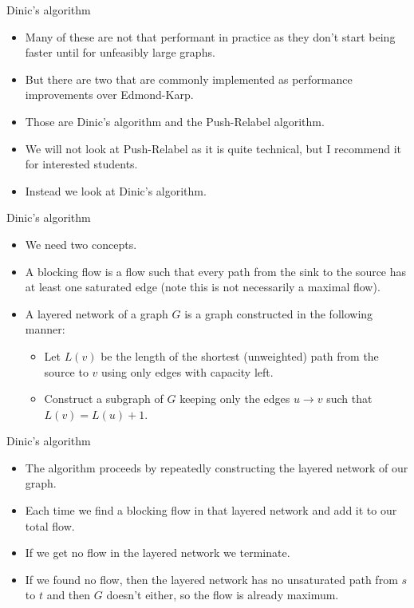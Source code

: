 \documentclass{beamer}
\begin{document}
	\begin{frame}[plain]{Dinic's algorithm}
		\begin{itemize}
			\item Many of these are not that performant in practice as they don't start being faster until for unfeasibly large graphs.
			\item But there are two that are commonly implemented as performance improvements over Edmond-Karp.
			\item Those are Dinic's algorithm and the Push-Relabel algorithm.
			\item We will not look at Push-Relabel as it is quite technical, but I recommend it for interested students. 
			\item Instead we look at Dinic's algorithm.
		\end{itemize}
	\end{frame}
	
	\begin{frame}[plain]{Dinic's algorithm}
		\begin{itemize}
			\item We need two concepts. 
			\item A blocking flow is a flow such that every path from the sink to the source has at least one saturated edge (note this is not necessarily a maximal flow).
			\item A layered network of a graph $G$ is a graph constructed in the following manner:
			\begin{itemize}
				\item Let $L(v)$ be the length of the shortest (unweighted) path from the source to $v$ using only edges with capacity left.
				\item Construct a subgraph of $G$ keeping only the edges $u \rightarrow v$ such that $L(v) = L(u) + 1$.
			\end{itemize}
		\end{itemize}
	\end{frame}
	
	\begin{frame}[plain]{Dinic's algorithm}
		\begin{itemize}
			\item The algorithm proceeds by repeatedly constructing the layered network of our graph.
			\item Each time we find a blocking flow in that layered network and add it to our total flow.
			\item If we get no flow in the layered network we terminate.
			\item If we found no flow, then the layered network has no unsaturated path from $s$ to $t$ and then $G$ doesn't either, so the flow is already maximum.
		\end{itemize}
	\end{frame}
	
\end{document}

